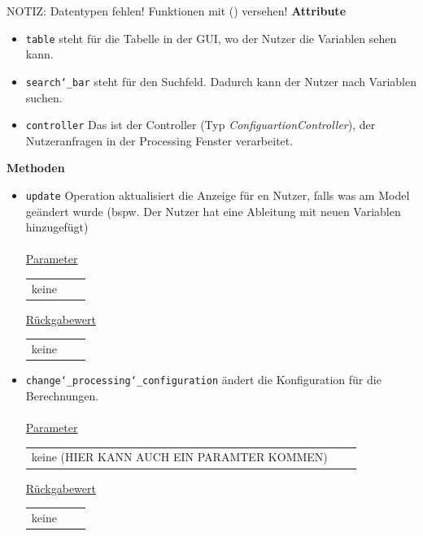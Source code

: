 \documentclass{article}
\begin{document}
NOTIZ: Datentypen fehlen! Funktionen mit () versehen!
\textbf{{Attribute}}
\begin{itemize}
\item \texttt{table} \newline steht für die Tabelle in der GUI, wo der Nutzer die Variablen sehen kann.
\item \texttt{search\char`_bar} \newline steht für den Suchfeld. Dadurch kann der Nutzer nach Variablen suchen.
\item \texttt{controller} \newline Das ist der Controller (Typ \textit{ConfiguartionController}), der Nutzeranfragen in der Processing Fenster verarbeitet.
\end{itemize}

\textbf{{Methoden}}
\begin{itemize}
\item \texttt{update} \newline Operation aktualisiert die Anzeige für en Nutzer, falls was am Model geändert wurde (bspw. Der Nutzer hat eine  Ableitung mit neuen Variablen hinzugefügt)
\\\\
\underline{{Parameter}} 
\begin{tabular}{lll}
keine
\end{tabular}

\underline{{Rückgabewert}}
\begin{tabular}{lll}
keine
\end{tabular}
\item \texttt{change\char`_processing\char`_configuration} \newline ändert die Konfiguration für die Berechnungen.
\\\\
\underline{{Parameter}} 
\begin{tabular}{lll}
keine (HIER KANN AUCH EIN PARAMTER KOMMEN)
\end{tabular}

\underline{{Rückgabewert}}
\begin{tabular}{lll}
keine
\end{tabular}
\end{itemize}
\end{document}
